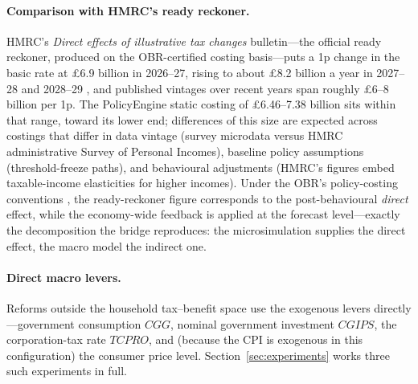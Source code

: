\paragraph{Comparison with HMRC's ready reckoner.} HMRC's \emph{Direct effects of illustrative tax changes} bulletin---the official ready reckoner, produced on the OBR-certified costing basis---puts a 1p change in the basic rate at \pounds 6.9 billion in 2026--27, rising to about \pounds 8.2 billion a year in 2027--28 and 2028--29 \citep{hmrc2025reckoner}, and published vintages over recent years span roughly \pounds 6--8 billion per 1p. The PolicyEngine static costing of \pounds 6.46--7.38 billion sits within that range, toward its lower end; differences of this size are expected across costings that differ in data vintage (survey microdata versus HMRC administrative Survey of Personal Incomes), baseline policy assumptions (threshold-freeze paths), and behavioural adjustments (HMRC's figures embed taxable-income elasticities for higher incomes). Under the OBR's policy-costing conventions \citep{obr2014costings}, the ready-reckoner figure corresponds to the post-behavioural \emph{direct} effect, while the economy-wide feedback is applied at the forecast level---exactly the decomposition the bridge reproduces: the microsimulation supplies the direct effect, the macro model the indirect one.

\paragraph{Direct macro levers.} Reforms outside the household tax--benefit space use the exogenous levers directly---government consumption $CGG$, nominal government investment $CGIPS$, the corporation-tax rate $TCPRO$, and (because the CPI is exogenous in this configuration) the consumer price level. Section~\ref{sec:experiments} works three such experiments in full.
